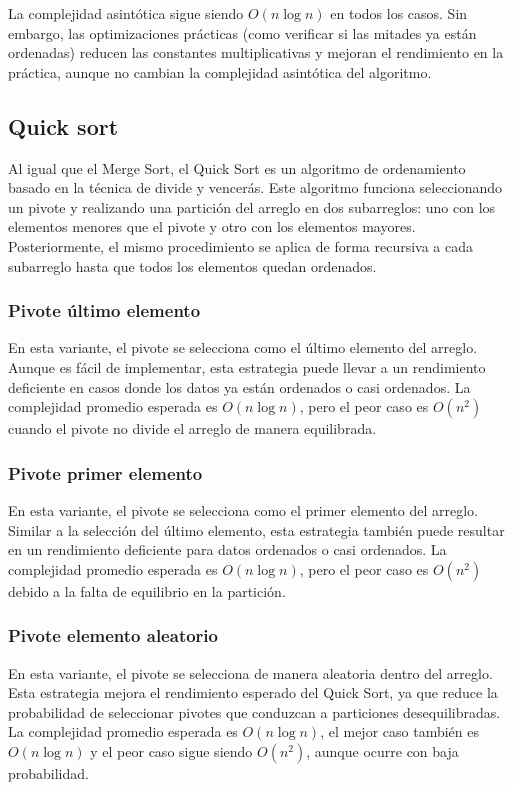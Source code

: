 La complejidad asintótica sigue siendo \(O(n \log n)\) en todos los casos. Sin embargo, las optimizaciones prácticas (como verificar si las mitades ya están ordenadas) reducen las constantes multiplicativas y mejoran el rendimiento en la práctica, aunque no cambian la complejidad asintótica del algoritmo.

\subsection{Quick sort}
Al igual que el Merge Sort, el Quick Sort es un algoritmo de ordenamiento basado en la técnica de divide y vencerás.
Este algoritmo funciona seleccionando un pivote y realizando una partición del arreglo en dos subarreglos: uno con los elementos menores que el pivote y otro con los elementos mayores. Posteriormente, el mismo procedimiento se aplica de forma recursiva a cada subarreglo hasta que todos los elementos quedan ordenados.

\subsubsection{Pivote último elemento}
En esta variante, el pivote se selecciona como el último elemento del arreglo. Aunque es fácil de implementar, esta estrategia puede llevar a un rendimiento deficiente en casos donde los datos ya están ordenados o casi ordenados. La complejidad promedio esperada es \(O(n \log n)\), pero el peor caso es \(O(n^2)\) cuando el pivote no divide el arreglo de manera equilibrada.

\subsubsection{Pivote primer elemento}
En esta variante, el pivote se selecciona como el primer elemento del arreglo. Similar a la selección del último elemento, esta estrategia también puede resultar en un rendimiento deficiente para datos ordenados o casi ordenados. La complejidad promedio esperada es \(O(n \log n)\), pero el peor caso es \(O(n^2)\) debido a la falta de equilibrio en la partición.

\subsubsection{Pivote elemento aleatorio}
En esta variante, el pivote se selecciona de manera aleatoria dentro del arreglo. Esta estrategia mejora el rendimiento esperado del Quick Sort, ya que reduce la probabilidad de seleccionar pivotes que conduzcan a particiones desequilibradas. La complejidad promedio esperada es \(O(n \log n)\), el mejor caso también es \(O(n \log n)\) y el peor caso sigue siendo \(O(n^2)\), aunque ocurre con baja probabilidad.

